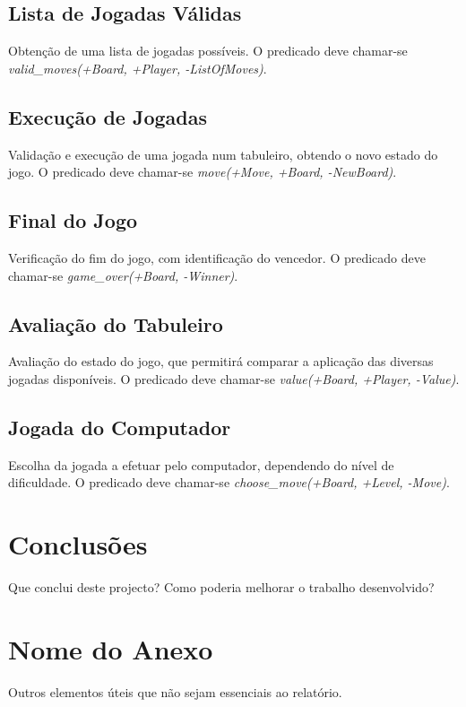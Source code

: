 \documentclass[a4paper]{article}
\begin{document}
\subsection{Lista de Jogadas Válidas} 
Obtenção de uma lista de jogadas possíveis. O predicado deve chamar-se \textit{valid\_moves(+Board, +Player, -ListOfMoves)}.


\subsection{Execução de Jogadas} 
Validação e execução de uma jogada num tabuleiro, obtendo o novo estado do jogo. O predicado deve chamar-se \textit{move(+Move, +Board, -NewBoard)}.


\subsection{Final do Jogo} 
Verificação do fim do jogo, com identificação do vencedor. O predicado deve chamar-se \textit{game\_over(+Board, -Winner)}.


\subsection{Avaliação do Tabuleiro}
Avaliação do estado do jogo, que permitirá comparar a aplicação das diversas jogadas disponíveis. O predicado deve chamar-se \textit{value(+Board, +Player, -Value)}.


\subsection{Jogada do Computador} 
Escolha da jogada a efetuar pelo computador, dependendo do nível de dificuldade. O predicado deve chamar-se \textit{choose\_move(+Board, +Level, -Move)}.



\section{Conclusões}
Que conclui deste projecto? Como poderia melhorar o trabalho desenvolvido?


\clearpage
\renewcommand\refname{Bibliografia}



\newpage
\appendix
\section{Nome do Anexo}
Outros elementos úteis que não sejam essenciais ao relatório.
\end{document}
